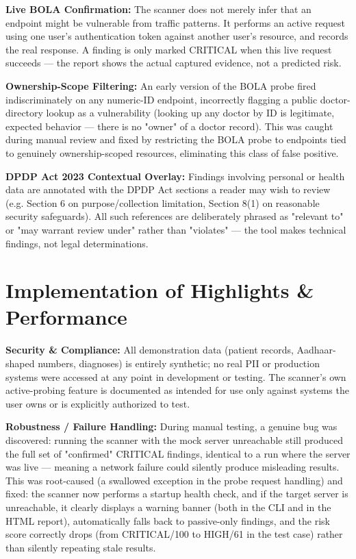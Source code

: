 \documentclass[11pt]{article}
\newcommand{\sublabel}[1]{\textcolor{accent}{\textbf{#1}}}
\begin{document}
\sublabel{Live BOLA Confirmation:} The scanner does not merely infer that an endpoint might be vulnerable from traffic patterns. It performs an active request using one user's authentication token against another user's resource, and records the real response. A finding is only marked CRITICAL when this live request succeeds --- the report shows the actual captured evidence, not a predicted risk.

\sublabel{Ownership-Scope Filtering:} An early version of the BOLA probe fired indiscriminately on any numeric-ID endpoint, incorrectly flagging a public doctor-directory lookup as a vulnerability (looking up any doctor by ID is legitimate, expected behavior --- there is no "owner" of a doctor record). This was caught during manual review and fixed by restricting the BOLA probe to endpoints tied to genuinely ownership-scoped resources, eliminating this class of false positive.

\sublabel{DPDP Act 2023 Contextual Overlay:} Findings involving personal or health data are annotated with the DPDP Act sections a reader may wish to review (e.g. Section 6 on purpose/collection limitation, Section 8(1) on reasonable security safeguards). All such references are deliberately phrased as "relevant to" or "may warrant review under" rather than "violates" --- the tool makes technical findings, not legal determinations.

\section{Implementation of Highlights \& Performance}

\sublabel{Security \& Compliance:} All demonstration data (patient records, Aadhaar-shaped numbers, diagnoses) is entirely synthetic; no real PII or production systems were accessed at any point in development or testing. The scanner's own active-probing feature is documented as intended for use only against systems the user owns or is explicitly authorized to test.

\sublabel{Robustness / Failure Handling:} During manual testing, a genuine bug was discovered: running the scanner with the mock server unreachable still produced the full set of "confirmed" CRITICAL findings, identical to a run where the server was live --- meaning a network failure could silently produce misleading results. This was root-caused (a swallowed exception in the probe request handling) and fixed: the scanner now performs a startup health check, and if the target server is unreachable, it clearly displays a warning banner (both in the CLI and in the HTML report), automatically falls back to passive-only findings, and the risk score correctly drops (from CRITICAL/100 to HIGH/61 in the test case) rather than silently repeating stale results.
\end{document}
